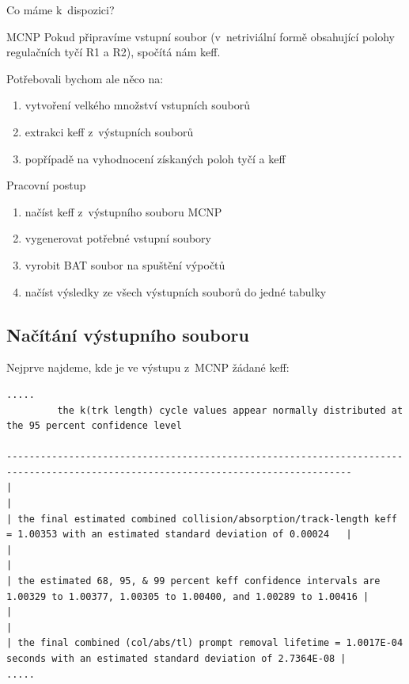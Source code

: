 \documentclass{beamer}
\begin{document}
\begin{frame}{Co máme k~dispozici?}
  \begin{block}{MCNP}
    Pokud připravíme vstupní soubor (v~netriviální formě obsahující polohy regulačních tyčí R1 a R2), spočítá nám keff.
  \end{block}
  Potřebovali bychom ale něco na:
  \begin{enumerate}
    \item vytvoření velkého množství vstupních souborů
    \item extrakci keff z~výstupních souborů
    \item popřípadě na vyhodnocení získaných poloh tyčí a keff
  \end{enumerate}
\end{frame}

\begin{frame}{Pracovní postup}
  \begin{enumerate}
    \item načíst keff z~výstupního souboru MCNP
    \pause
    \item vygenerovat potřebné vstupní soubory
    \pause
    \item vyrobit BAT soubor na spuštění výpočtů
    \pause
    \item načíst výsledky ze všech výstupních souborů do jedné tabulky
  \end{enumerate}
\end{frame}

\subsection{Načítání výstupního souboru}

\begin{frame}[fragile]{}
  Nejprve najdeme, kde je ve výstupu z~MCNP žádané keff:
  {\tiny
  \begin{verbatim}
.....
         the k(trk length) cycle values appear normally distributed at the 95 percent confidence level

-----------------------------------------------------------------------------------------------------------------------------------
|                                                                                                                                 |
| the final estimated combined collision/absorption/track-length keff = 1.00353 with an estimated standard deviation of 0.00024   |
|                                                                                                                                 |
| the estimated 68, 95, & 99 percent keff confidence intervals are 1.00329 to 1.00377, 1.00305 to 1.00400, and 1.00289 to 1.00416 |
|                                                                                                                                 |
| the final combined (col/abs/tl) prompt removal lifetime = 1.0017E-04 seconds with an estimated standard deviation of 2.7364E-08 |
.....
  \end{verbatim}
  }
\end{frame}
\end{document}
